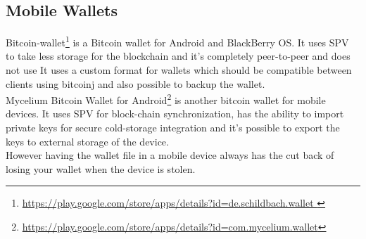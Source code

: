 \subsection{Mobile Wallets}
Bitcoin-wallet\footnote{\url{https://play.google.com/store/apps/details?id=de.schildbach.wallet }} is a Bitcoin wallet for Android and BlackBerry OS. It uses SPV to take less storage for the blockchain and it's completely peer-to-peer and does not use It uses a custom format for wallets which should be compatible between clients using bitcoinj and also possible to backup the wallet.\\
Mycelium Bitcoin Wallet for Android\footnote{\url {https://play.google.com/store/apps/details?id=com.mycelium.wallet}} is another bitcoin wallet for mobile devices. It uses SPV for block-chain synchronization, has the ability to import private keys for secure cold-storage integration and it's possible to export the keys to external storage of the device.\\ 
However having the wallet file in a mobile device always has the cut back of losing your wallet when the device is stolen.


